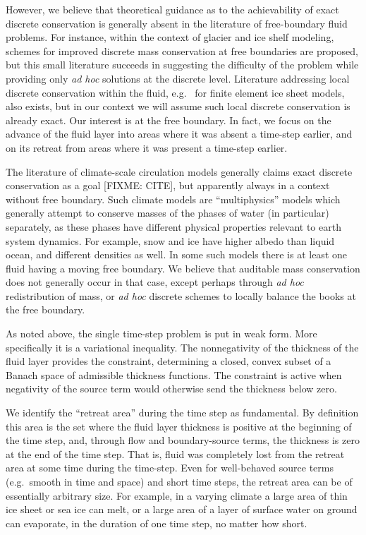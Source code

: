\documentclass[final,leqno,onefignum,onetabnum]{siamltex1213bueler}
\begin{document}
However, we believe that theoretical guidance as to the achievability of exact discrete conservation is generally absent in the literature of free-boundary fluid problems.  For instance, within the context of glacier \cite{JaroschSchoofAnslow2013} and ice shelf \cite{Albrechtetal2011} modeling, schemes for improved discrete mass conservation at free boundaries are proposed, but this small literature succeeds in suggesting the difficulty of the problem while providing only \emph{ad hoc} solutions at the discrete level.  Literature addressing local discrete conservation within the fluid, e.g.~\cite{Lengetal2014} for finite element ice sheet models, also exists, but in our context we will assume such local discrete conservation is already exact.  Our interest is at the free boundary.  In fact, we focus on the advance of the fluid layer into areas where it was absent a time-step earlier, and on its retreat from areas where it was present a time-step earlier.

The literature of climate-scale circulation models generally claims exact discrete conservation as a goal [FIXME: CITE], but apparently always in a context without free boundary.  Such climate models are ``multiphysics'' models which generally attempt to conserve masses of the phases of water (in particular) separately, as these phases have different physical properties relevant to earth system dynamics.  For example, snow and ice have higher albedo than liquid ocean, and different densities as well.  In some such models there is at least one fluid having a moving free boundary.  We believe that auditable mass conservation does not generally occur in that case, except perhaps through \emph{ad hoc} redistribution of mass, or \emph{ad hoc} discrete schemes to locally balance the books at the free boundary.

As noted above, the single time-step problem is put in weak form.  More specifically it is a variational inequality.  The nonnegativity of the thickness of the fluid layer provides the constraint, determining a closed, convex subset of a Banach space of admissible thickness functions.  The constraint is active when negativity of the source term would otherwise send the thickness below zero.

We identify the ``retreat area'' during the time step as fundamental.  By definition this area is the set where the fluid layer thickness is positive at the beginning of the time step, and, through flow and boundary-source terms, the thickness is zero at the end of the time step.  That is, fluid was completely lost from the retreat area at some time during the time-step.  Even for well-behaved source terms (e.g.~smooth in time and space) and short time steps, the retreat area can be of essentially arbitrary size.  For example, in a varying climate a large area of thin ice sheet or sea ice can melt, or a large area of a layer of surface water on ground can evaporate, in the duration of one time step, no matter how short.
\end{document}
